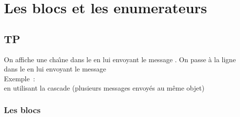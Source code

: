 
\ifx\wholebook\relax\else


\fi

\chapter{Les blocs et les enumerateurs}

%



%

\section{TP}

On affiche une cha\^{\i}ne dans le  en lui envoyant le
message . On passe \`a la ligne dans le
 en lui envoyant le message \\
Exemple~:
\\
en utilisant la cascade (plusieurs messages envoy\'es au m\^eme objet)\\
 
\subsection{Les blocs}

